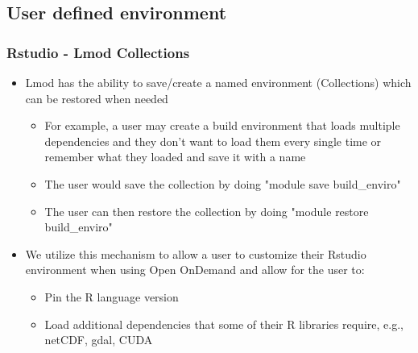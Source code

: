 \subsection[rstudiodeps]{User defined environment}
\begin{frame}
	\frametitle{Rstudio - Lmod Collections}
	\begin{block}{}
	\begin{itemize}
		\item Lmod has the ability to save/create a named environment (Collections) which can be restored when needed
		\begin{itemize}
			\item For example, a user may create a build environment that loads multiple dependencies and they don't want to load them every single time or remember what they loaded and save it with a name
			\item The user would save the collection by doing "module save build\_enviro" 
			\item The user can then restore the collection by doing "module restore build\_enviro"
		\end{itemize}
		\item  We utilize this mechanism to allow a user to customize their Rstudio environment when using Open OnDemand and allow for the user to:
		\begin{itemize}
			\item Pin the R language version
			\item Load additional dependencies that some of their R libraries require, e.g., netCDF, gdal, CUDA
		\end{itemize}
	\end{itemize}
	\end{block}
\end{frame}


